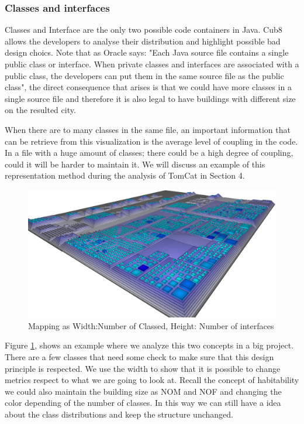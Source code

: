 \documentclass[]{usiinfbachelorproject}
\begin{document}
\subsubsection{Classes and interfaces}

Classes and Interface are the only two possible code containers in Java. Cub8 allows the developers to analyse their distribution and highlight possible bad design choics.
Note that as Oracle \cite{oracle} says: "Each Java source file contains a single public class or interface. When private classes and interfaces are associated with a public class, the developers can put them in the same source file as the public class", the direct consequence that arises is that we could have more classes in a single source file and therefore it is also legal to have buildings with different size on the resulted city.

When there are to many classes in the same file, an important information that can be retrieve from this visualization is the average level of coupling in the code. In a file with a huge amount of classes; there could be a high degree of coupling, could it will be harder to maintain it. We will discuss an example of this representation method during the analysis of TomCat in Section 4. 





\begin{figure}[H]
	\centering
	\includegraphics[width=.95\textwidth]{images/ClassesAndInterfaces}
	\caption[Classes and Interfaces Mapping]{Mapping as Width:Number of Classed, Height: Number of interfaces \label{fig:classInterface}}
\end{figure}


Figure \ref{fig:classInterface}, shows an example where we analyze this two concepts in a big project. There are a few classes that need some check to make sure that this design principle is respected. We use the width to show that it is possible to change metrics respect to what we are going to look at. Recall the concept of habitability \cite{programComp} we could also maintain the building size as NOM and NOF and changing the color depending of the number of classes. In this way we can still have a idea about the class distributions and keep the structure unchanged. 
\end{document}

